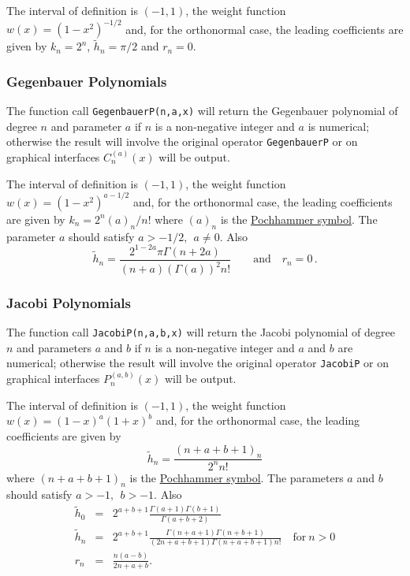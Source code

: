 The interval of definition is $(-1, 1)$, the weight function
$w(x)=(1-x^2)^{-1/2}$ and, for the orthonormal case, the leading
coefficients are given by $k_n= 2^n$, $\tilde{h}_n = \pi/2$ and $r_n=0$.

\subsubsection{Gegenbauer Polynomials}
\hypertarget{GEGENBAUERP}{}
 
The function call \texttt{GegenbauerP(n,a,x)} will return the Gegenbauer
polynomial of degree $n$ and parameter $a$ if $n$ is a non-negative integer
and $a$ is numerical; otherwise the result will involve the original operator
\texttt{GegenbauerP} or on graphical interfaces $C_n^{(a)}(x)$ will be output.

The interval of definition is $(-1, 1)$, the weight function
$w(x)=(1-x^2)^{a-1/2}$ and, for the orthonormal case, the leading
coefficients are given by $k_n= 2^n (a)_n/n!$ where $(a)_n$ is the
\hyperlink{POCH}{Pochhammer symbol}.
The parameter $a$ should satisfy $a >-1/2,\ \ a \neq 0$. Also
\[\tilde{h}_n = \frac{2^{1-2 a}\pi \Gamma(n+2a)}{(n+a)(\Gamma(a))^2n!}\qquad
\mbox{and}\quad r_n=0\,.\]

\subsubsection{Jacobi Polynomials}
\hypertarget{JACOBIP}{}
 
The function call \texttt{JacobiP(n,a,b,x)} will return the Jacobi
polynomial of degree $n$ and parameters $a$ and $b$ if $n$ is a non-negative
integer  and $a$ and $b$ are numerical; otherwise the result will involve
the original operator \texttt{JacobiP} or on graphical interfaces
$P_n^{(a, b)}(x)$ will be output.

The interval of definition is $(-1, 1)$, the weight function
$w(x)=(1-x)^a(1+x)^b$ and, for the orthonormal case, the leading
coefficients are given by
\[\tilde{h}_n = \frac{(n+a+b+1)_n}{2^nn!}\]
where $(n+a+b+1)_n$ is the \hyperlink{POCH}{Pochhammer symbol}.
The parameters $a$ and $b$ should satisfy $a >-1,\ \ b > -1$. Also
\begin{eqnarray*}
\tilde{h}_0 & = & 2^{a+b+1}\frac{\Gamma(a+1)\Gamma(b+1)}{\Gamma(a+b+2)}\\
\tilde{h}_n & = & 2^{a+b+1}\frac{\Gamma(n+a+1)\Gamma(n+b+1)}{(2 n +a+b+1)
\Gamma(n+a+b+1)n!}\quad \mbox{for}\ n>0\\
r_n & = & \frac{n(a-b)}{2n+a+b}.
\end{eqnarray*}

